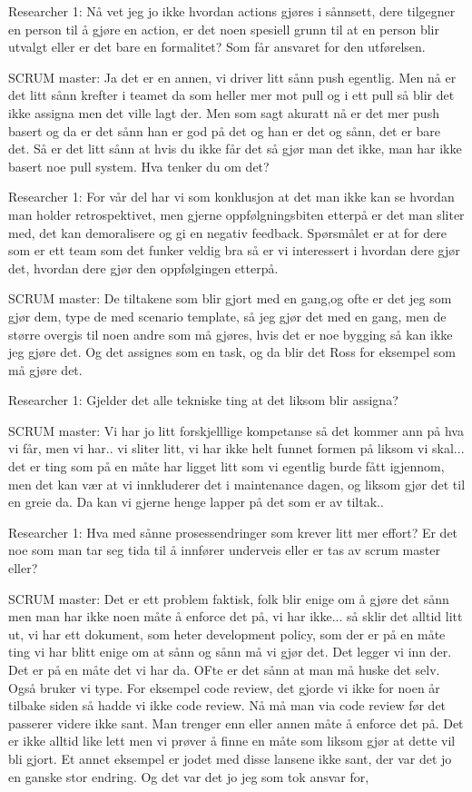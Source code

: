 \documentclass[12pt, a4paper]{report}
\begin{document}
Researcher 1: Nå vet jeg jo ikke hvordan actions gjøres i sånnsett, dere tilgegner en person til å gjøre en action, er det noen spesiell grunn til at en person blir utvalgt eller er det bare en formalitet?  Som får ansvaret for den utførelsen.

SCRUM master: Ja det er en annen, vi driver litt sånn push egentlig. Men nå er det litt sånn krefter i teamet da som heller mer mot pull og i ett pull så blir det ikke assigna men det ville lagt der. Men som sagt akuratt nå er det mer push basert og da er det sånn han er god på det og han er det og sånn, det er bare det.  Så er det litt sånn at hvis du ikke får det så gjør man det ikke, man har ikke basert noe pull system. Hva tenker du om det?

Researcher 1: For vår del har vi som konklusjon at det man ikke kan se hvordan man holder retrospektivet, men gjerne oppfølgningsbiten etterpå er det man sliter med, det kan demoralisere og gi en negativ feedback. Spørsmålet er at for dere som er ett team som det funker veldig bra så er vi interessert i hvordan dere gjør det, hvordan dere gjør den oppfølgingen etterpå.

SCRUM master: De tiltakene som blir gjort  med en gang,og ofte er det jeg som gjør dem, type de med scenario template, så jeg gjør det med en gang, men de større overgis til noen andre som må gjøres, hvis det er noe bygging så kan ikke jeg gjøre det. Og det assignes som en task, og da blir det Ross for eksempel som må gjøre det.

Researcher 1: Gjelder det alle tekniske ting at det liksom blir assigna?

SCRUM master: Vi har jo litt forskjelllige kompetanse så det kommer ann på hva vi får, men vi har.. vi sliter litt, vi har ikke helt funnet formen på liksom vi skal... det er ting som på en måte har ligget litt som vi egentlig burde fått igjennom, men  det kan vær at vi innkluderer det i maintenance dagen, og liksom gjør det til en greie da. Da kan vi gjerne henge lapper på det som er av tiltak..

Researcher 1: Hva med sånne prosessendringer som krever litt mer effort? Er det noe som man tar seg tida til å innfører underveis eller er tas av scrum master eller?

SCRUM master: Det er ett problem faktisk, folk blir enige om å gjøre det sånn men man har ikke noen måte å enforce det på, vi har ikke... så sklir det alltid litt ut, vi har ett dokument, som heter development policy, som der er på en måte ting vi har blitt enige om at sånn og sånn må vi gjør det. Det legger vi inn der. Det er på en måte det vi har da. OFte er det sånn at man må huske det selv. Også bruker vi type. For eksempel code review, det gjorde vi ikke for noen år tilbake siden så hadde vi ikke code review. Nå må man via code review før det passerer videre ikke sant. Man trenger enn eller annen måte å enforce det på. Det er ikke alltid like lett men vi prøver å finne en måte som liksom gjør at dette vil bli gjort. Et annet eksempel er jodet med disse lansene ikke sant, der var det jo en ganske stor endring. Og det var det jo jeg som tok ansvar for, 
\end{document}
